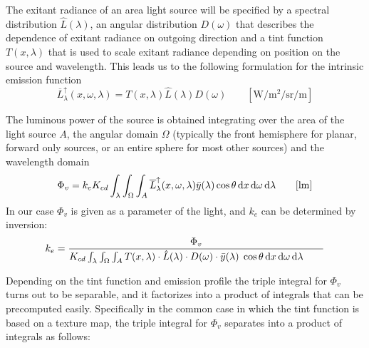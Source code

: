 The exitant radiance of an area light source will be specified by a spectral
distribution $\hat{L}(\lambda)$, an angular distribution $D(\omega)$ that
describes the dependence of exitant radiance on outgoing direction and a tint
function $T(x,\lambda)$ that is used to scale exitant radiance depending on
position on the source and wavelength. This leads us to the following
formulation for the intrinsic emission function
\begin{equation}
\overline{L}^\uparrow_{\lambda}(x, \omega, \lambda) = T(x, \lambda)
\hat{L}(\lambda) D(\omega)
\qquad \left[\unit{\watt\per\square\meter\per\steradian\per\meter}\right]
\end{equation}

The luminous power of the source is obtained integrating over the area of the
light source $A$, the angular domain $\Omega$ (typically the front hemisphere
for planar, forward only sources, or an entire sphere for most other sources)
and the wavelength domain
\begin{equation}
\Phi_v = k_e K_{cd} \int_\lambda \int_\Omega \int_A
\overline{L}^\uparrow_{\lambda}(x, \omega, \lambda) \bar y (\lambda) \cos\theta
\d x \d\omega \d\lambda
\qquad [\unit{\lumen}]
\end{equation}
In our case $\Phi_v$ is given as a parameter of the light, and $k_e$ can be
determined by inversion:
\begin{equation}
k_e = \frac{\Phi_v}{K_{cd} \int_\lambda \int_\Omega \int_A T(x, \lambda) \cdot
\hat{L}(\lambda) \cdot D(\omega) \cdot \bar y (\lambda) \; \cos\theta \mathop{}\!\mathrm{d} x \mathop{}\!\mathrm{d}\omega
\mathop{}\!\mathrm{d}\lambda \qquad}
\end{equation}

Depending on the tint function and emission profile the triple integral for
$\Phi_v$ turns out to be separable, and it factorizes into a product of
integrals that can be precomputed easily.
Specifically in the common case in which the tint function is based on a texture
map, the triple integral for $\Phi_v$ separates into a product of integrals as
follows:

